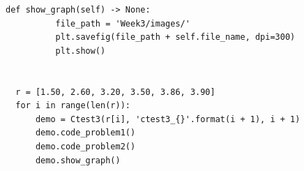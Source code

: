 \begin{lstlisting}[caption=week2.py]
      def show_graph(self) -> None:
          file_path = 'Week3/images/'
          plt.savefig(file_path + self.file_name, dpi=300)
          plt.show()


  r = [1.50, 2.60, 3.20, 3.50, 3.86, 3.90]
  for i in range(len(r)):
      demo = Ctest3(r[i], 'ctest3_{}'.format(i + 1), i + 1)
      demo.code_problem1()
      demo.code_problem2()
      demo.show_graph()

\end{lstlisting}